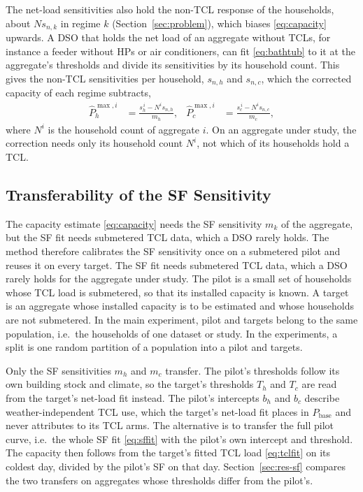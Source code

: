 The net-load sensitivities also hold the non-TCL response of the households, about $N s_{n,k}$ in regime $k$ (Section~\ref{sec:problem}), which biases \eqref{eq:capacity} upwards. A DSO that holds the net load of an aggregate without TCLs, for instance a feeder without HPs or air conditioners, can fit \eqref{eq:bathtub} to it at the aggregate's thresholds and divide its sensitivities by its household count. This gives the non-TCL sensitivities per household, $s_{n,h}$ and $s_{n,c}$, which the corrected capacity of each regime subtracts,
\begin{equation}
\begin{aligned}
    \hat{P}_h^{\max,i} &= \frac{s_h^{\,i} - N^i s_{n,h}}{m_h}, & \hat{P}_c^{\max,i} &= \frac{s_c^{\,i} - N^i s_{n,c}}{m_c},
\end{aligned}
\label{eq:capacity-corr}
\end{equation}
where $N^i$ is the household count of aggregate $i$. On an aggregate under study, the correction needs only its household count $N^i$, not which of its households hold a TCL.

\subsection{Transferability of the SF Sensitivity}
\label{sec:transfer}

The capacity estimate \eqref{eq:capacity} needs the SF sensitivity $m_k$ of the aggregate, but the SF fit needs submetered TCL data, which a DSO rarely holds. The method therefore calibrates the SF sensitivity once on a submetered pilot and reuses it on every target. The SF fit needs submetered TCL data, which a DSO rarely holds for the aggregate under study. The pilot is a small set of households whose TCL load is submetered, so that its installed capacity is known. A target is an aggregate whose installed capacity is to be estimated and whose households are not submetered. In the main experiment, pilot and targets belong to the same population, i.e.\ the households of one dataset or study. In the experiments, a split is one random partition of a population into a pilot and targets.

Only the SF sensitivities $m_h$ and $m_c$ transfer. The pilot's thresholds follow its own building stock and climate, so the target's thresholds $T_h$ and $T_c$ are read from the target's net-load fit instead. The pilot's intercepts $b_h$ and $b_c$ describe weather-independent TCL use, which the target's net-load fit places in $P_{\mathrm{base}}$ and never attributes to its TCL arms. The alternative is to transfer the full pilot curve, i.e.\ the whole SF fit \eqref{eq:sffit} with the pilot's own intercept and threshold. The capacity then follows from the target's fitted TCL load \eqref{eq:tclfit} on its coldest day, divided by the pilot's SF on that day. Section~\ref{sec:res-sf} compares the two transfers on aggregates whose thresholds differ from the pilot's.

